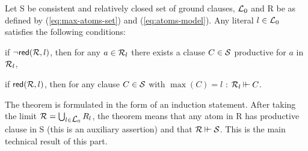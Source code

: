\begin{THEOREM} \label{le:main-theorem}
Let \C S be consistent and relatively closed set of ground clauses, \(\mbox {$\cal L$}_0\) 
and \C R be as defined by (\ref {eq:max-atoms-set}) and (\ref {eq:atoms-model}).
Any literal \(l\in \mbox {$\cal L$}_0\) satisfies the following conditions:
\begin{description}\MyLPar
\item[I1.] if \(\neg\mbox{\sf red}({\cal R},l)\), then for any \(a\in\mbox {$\cal R$}_l\) there
  exists a clause $C\in \mbox {$\cal S$}$ productive for $a$ in \(\mbox {$\cal R$}_l\),
\item[I2.] if \(\mbox{\sf red}(\mbox {$\cal R$},l)\), then for any clause   
  \(C\in \mbox {$\cal S$}\) with \(\max(C)=l\) : $\mathrel{\mbox {$\cal R$}_l \mathbin{\vdash\!\!\vdash} C}$.
\end{description}
\end{THEOREM}
The theorem is formulated in the form of an induction statement. 
After taking the
limit \(\mbox {$\cal R$}=\bigcup_{l\in\mbox {$\cal L$}_0} R_l\), the theorem
means that any atom in \C R has productive clause in \C S
(this is an auxiliary assertion) and that \(\mathrel{\mbox {$\cal R$} \mathbin{\vdash\!\!\vdash} \mbox {$\cal S$}}\).
This is the main technical result of this part.
%

